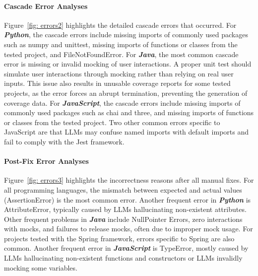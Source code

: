 \paragraph{Cascade Error Analyses}
Figure~\ref{fig: errors2} highlights the detailed cascade errors that occurred.
For \textbf{\textit{Python}}, the cascade errors include missing imports of commonly used packages such as numpy and unittest, missing imports of functions or classes from the tested project, and FileNotFoundError. 
For \textbf{\textit{Java}}, the most common cascade error is missing or invalid mocking of user interactions. A proper unit test should simulate user interactions through mocking rather than relying on real user inputs. This issue also results in unusable coverage reports for some tested projects, as the error forces an abrupt termination, preventing the generation of coverage data.
For \textbf{\textit{JavaScript}}, the cascade errors include missing imports of commonly used packages such as chai and three, and missing imports of functions or classes from the tested project. Two other common errors specific to JavaScript are that LLMs may confuse named imports with default imports and fail to comply with the Jest framework. 


\paragraph{Post-Fix Error Analyses}
Figure~\ref{fig: errors3} highlights the incorrectness reasons after all manual fixes.
For all programming languages, the mismatch between expected and actual values (AssertionError) is the most common error.
Another frequent error in \textbf{\textit{Python}} is AttributeError, typically caused by LLMs hallucinating non-existent attributes.
Other frequent problems in \textbf{\textit{Java}} include NullPointer Errors, zero interactions with mocks, and failures to release mocks, often due to improper mock usage. For projects tested with the Spring framework, errors specific to Spring are also common.
Another frequent error in \textbf{\textit{JavaScript}} is TypeError, mostly caused by LLMs hallucinating non-existent functions and constructors or LLMs invalidly mocking some variables.



